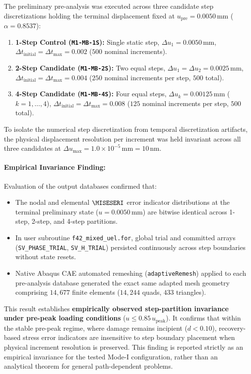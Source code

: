 The preliminary pre-analysis was executed across three candidate step discretizations holding the terminal displacement fixed at $u_{\mathrm{pre}} = 0.0050\,\mathrm{mm}$ ($\alpha = 0.8537$):
\begin{enumerate}
  \item \textbf{1-Step Control (\texttt{M1-MB-1S}):} Single static step, $\Delta u_1 = 0.0050\,\mathrm{mm}$, $\Delta t_{\mathrm{initial}} = \Delta t_{\max} = 0.002$ ($500$ nominal increments).
  \item \textbf{2-Step Candidate (\texttt{M1-MB-2S}):} Two equal steps, $\Delta u_1 = \Delta u_2 = 0.0025\,\mathrm{mm}$, $\Delta t_{\mathrm{initial}} = \Delta t_{\max} = 0.004$ ($250$ nominal increments per step, $500$ total).
  \item \textbf{4-Step Candidate (\texttt{M1-MB-4S}):} Four equal steps, $\Delta u_k = 0.00125\,\mathrm{mm}$ ($k=1,\dots,4$), $\Delta t_{\mathrm{initial}} = \Delta t_{\max} = 0.008$ ($125$ nominal increments per step, $500$ total).
\end{enumerate}

To isolate the numerical step discretization from temporal discretization artifacts, the physical displacement resolution per increment was held invariant across all three candidates at $\Delta u_{\max} = 1.0 \times 10^{-5}\,\mathrm{mm} = 10\,\mathrm{nm}$. 

\paragraph{Empirical Invariance Finding:}
Evaluation of the output databases confirmed that:
\begin{itemize}
  \item The nodal and elemental $\MISESERI$ error indicator distributions at the terminal preliminary state ($u = 0.0050\,\mathrm{mm}$) are bitwise identical across 1-step, 2-step, and 4-step partitions.
  \item In user subroutine \texttt{f42\_mixed\_uel.for}, global trial and committed arrays (\texttt{SV\_PHASE\_TRIAL}, \texttt{SV\_H\_TRIAL}) persisted continuously across step boundaries without state resets.
  \item Native Abaqus CAE automated remeshing (\texttt{adaptiveRemesh}) applied to each pre-analysis database generated the exact same adapted mesh geometry comprising $14{,}677$ finite elements ($14{,}244$ quads, $433$ triangles).
\end{itemize}
This result establishes \textbf{empirically observed step-partition invariance under pre-peak loading conditions} ($u \le 0.85\,u_{\mathrm{peak}}$). It confirms that within the stable pre-peak regime, where damage remains incipient ($d < 0.10$), recovery-based stress error indicators are insensitive to step boundary placement when physical increment resolution is preserved. This finding is reported strictly as an empirical invariance for the tested Mode-I configuration, rather than an analytical theorem for general path-dependent problems.

